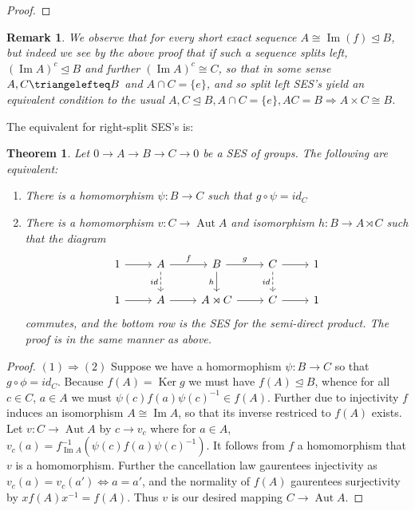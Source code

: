 \documentclass{report}
\DeclareMathOperator{\im}{Im}
\DeclareMathOperator{\ker}{Ker}
\DeclareMathOperator{\aut}{Aut}
\newtheorem{theorem}{Theorem}
\newtheorem{rmk}{Remark}
\begin{document}
\begin{singlespace}
\begin{enumerate}
\begin{proof}
     \end{proof}
     \begin{rmk}
       We observe that for every short exact sequence $A\cong \im (f)\trianglelefteq B$, but indeed we see by the above proof that if such a sequence splits left, $(\im A)^c\trianglelefteq B$ and further $(\im A)^c\cong C$, so that in some sense $A,C\triangelefteq B$ and $A\cap C=\{e\}$, and so split left SES's yield an equivalent condition to the usual $A,C\trianglelefteq B, A\cap C=\{e\}, AC=B\Rightarrow A\times C\cong B$.
     \end{rmk}     
     The equivalent for right-split SES's is:
     \begin{theorem}
        Let $0\to A\to B\to C\to 0$ be a SES of groups. The following are equivalent:
        \begin{enumerate}
        \item There is a homomorphism $\psi:B\to C$ such that $g \circ \psi=id_C$
        \item There is a homomorphism $v:C\to \aut A$ and isomorphism $h:B\to A\rtimes C$ such that the diagram
        \[\begin{tikzcd}
         1 & A & B & C & 1 \\
	 1 & A & {A\rtimes C} & C & 1
	 \arrow[from=1-1, to=1-2]
	 \arrow["f", from=1-2, to=1-3]
	 \arrow["g", from=1-3, to=1-4]
	 \arrow[from=1-4, to=1-5]
	 \arrow[from=2-1, to=2-2]
	 \arrow[from=2-2, to=2-3]
	 \arrow[from=2-3, to=2-4]
	 \arrow[from=2-4, to=2-5]
	 \arrow["id"', dashed, from=1-4, to=2-4]
	 \arrow["id"', dashed, from=1-2, to=2-2]
	 \arrow["h"', from=1-3, to=2-3]
        \end{tikzcd}\]
        commutes, and the bottom row is the SES for the semi-direct product. The proof is in the same manner as above.
       \end{enumerate}
     \end{theorem}
     \begin{proof}
       $(1)\Rightarrow (2)$ Suppose we have a homormophism $\psi:B\to C$ so that $g\circ \phi=id_C$. Because $f(A)=\ker g$ we must have $f(A)\trianglelefteq B$, whence for all $c\in C$, $a\in A$ we must $\psi(c)f(a)\psi(c)^{-1}\in f(A)$. Further due to injectivity $f$ induces an isomorphism $A\cong \im A$, so that its inverse restriced to $f(A)$ exists. Let $v:C\to \aut A$ by $c\to v_c$ where for $a\in A$, $v_c(a) = f_{\im A}^{-1}(\psi(c)f(a)\psi(c)^{-1})$. It follows from $f$ a homomorphism that $v$ is a homomorphism. Further the cancellation law gaurentees injectivity as $v_c(a)=v_c(a')\iff a=a'$, and the normality of $f(A)$ gaurentees surjectivity by $xf(A)x^{-1}=f(A)$. Thus $v$ is our desired mapping $C\to \aut A$.

\end{proof}
\end{enumerate}
\end{singlespace}
\end{document}
